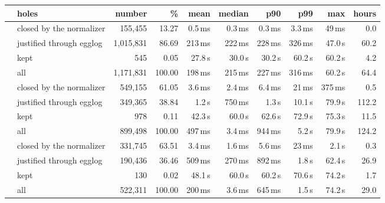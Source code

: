 \begin{tabular}{llrrrrrrrr}
\toprule
 & holes & number & \% & mean & median & p90 & p99 & max & hours \\
\midrule
\UF{} & closed by the normalizer & 155,455 & 13.27 & 0.5\,ms & 0.3\,ms & 0.3\,ms & 3.3\,ms & 49\,ms & 0.0 \\
 & justified through egglog & 1,015,831 & 86.69 & 213\,ms & 222\,ms & 228\,ms & 326\,ms & 47.0\,s & 60.2 \\
 & kept & 545 & 0.05 & 27.8\,s & 30.0\,s & 30.2\,s & 60.2\,s & 60.2\,s & 4.2 \\
 & all & 1,171,831 & 100.00 & 198\,ms & 215\,ms & 227\,ms & 316\,ms & 60.2\,s & 64.4 \\
\midrule
\LIA{} & closed by the normalizer & 549,155 & 61.05 & 3.6\,ms & 2.4\,ms & 6.4\,ms & 21\,ms & 375\,ms & 0.5 \\
 & justified through egglog & 349,365 & 38.84 & 1.2\,s & 750\,ms & 1.3\,s & 10.1\,s & 79.9\,s & 112.2 \\
 & kept & 978 & 0.11 & 42.3\,s & 60.0\,s & 62.6\,s & 72.9\,s & 75.3\,s & 11.5 \\
 & all & 899,498 & 100.00 & 497\,ms & 3.4\,ms & 944\,ms & 5.2\,s & 79.9\,s & 124.2 \\
\midrule
\LRA{} & closed by the normalizer & 331,745 & 63.51 & 3.4\,ms & 1.6\,ms & 5.6\,ms & 23\,ms & 2.1\,s & 0.3 \\
 & justified through egglog & 190,436 & 36.46 & 509\,ms & 270\,ms & 892\,ms & 1.8\,s & 62.4\,s & 26.9 \\
 & kept & 130 & 0.02 & 48.1\,s & 60.0\,s & 60.2\,s & 70.6\,s & 74.2\,s & 1.7 \\
 & all & 522,311 & 100.00 & 200\,ms & 3.6\,ms & 645\,ms & 1.5\,s & 74.2\,s & 29.0 \\
\bottomrule
\end{tabular}
